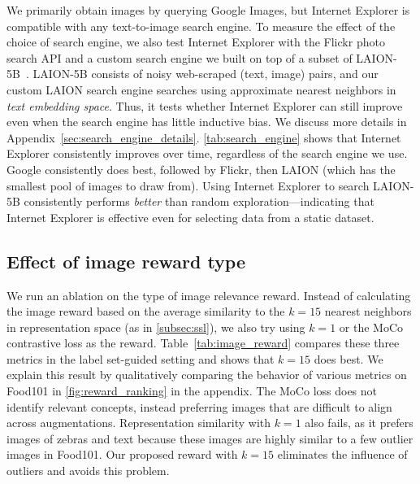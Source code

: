 We primarily obtain images by querying Google Images, but Internet Explorer is compatible with any text-to-image search engine. To measure the effect of the choice of search engine, we also test Internet Explorer with the Flickr photo search API and a custom search engine we built on top of a subset of LAION-5B~\cite{schuhmann2022laion}. LAION-5B consists of noisy web-scraped (text, image) pairs, and our custom LAION search engine searches using approximate nearest neighbors in \textit{text embedding space}. Thus, it tests whether Internet Explorer can still improve even when the search engine has little inductive bias. We discuss more details in Appendix~\ref{sec:search_engine_details}. \cref{tab:search_engine} shows that Internet Explorer consistently improves over time, regardless of the search engine we use. Google consistently does best, followed by Flickr, then LAION (which has the smallest pool of images to draw from). Using Internet Explorer to search LAION-5B consistently performs \textit{better} than random exploration---indicating that Internet Explorer is effective even for selecting data from a static dataset. 



\subsection{Effect of image reward type}
\label{subsec:reward_analysis}
We run an ablation on the type of image relevance reward. Instead of calculating the image reward based on the average similarity to the $k=15$ nearest neighbors in representation space (as in \cref{subsec:ssl}), we also try using $k=1$ or the MoCo contrastive loss as the reward. Table~\ref{tab:image_reward} compares these three metrics in the label set-guided setting and shows that $k=15$ does best. We explain this result by qualitatively comparing the behavior of various metrics on Food101 in \cref{fig:reward_ranking} in the appendix. The MoCo loss does not identify relevant concepts, instead preferring images that are difficult to align across augmentations. Representation similarity with $k=1$ also fails, as it prefers images of zebras and text because these images are highly similar to a few outlier images in Food101. Our proposed reward with $k=15$ eliminates the influence of outliers and avoids this problem.


